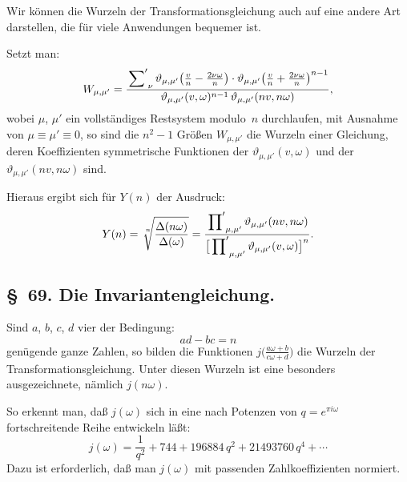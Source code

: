 \documentclass[11pt,a4paper]{article}
\theoremstyle{plain}
\theoremstyle{remark}
\begin{document}
Wir können die Wurzeln der Transformationsgleichung auch auf
eine andere Art darstellen, die für viele Anwendungen bequemer
ist.

Setzt man:
\begin{equation}\label{eq:68:1}
W_{\mu,\mu'} = \frac{
\sideset{}{'}\sum_{\nu}
\vartheta_{\mu,\mu'}\bigl(\frac{v}{n}-\frac{2\nu\omega}{n}\bigr)
\cdot
\vartheta_{\mu,\mu'}\bigl(\frac{v}{n}+\frac{2\nu\omega}{n}\bigr)^{n-1}}
{\vartheta_{\mu,\mu'}(v,\omega)^{n-1}\,
 \vartheta_{\mu,\mu'}(nv,n\omega)},
\end{equation}
wobei $\mu$, $\mu'$ ein vollständiges Restsystem modulo~$n$
durchlaufen, mit Ausnahme von $\mu\equiv\mu'\equiv 0$, so sind
die $n^2-1$ Größen $W_{\mu,\mu'}$ die Wurzeln einer Gleichung,
deren Koeffizienten symmetrische Funktionen der
$\vartheta_{\mu,\mu'}(v,\omega)$ und der
$\vartheta_{\mu,\mu'}(nv,n\omega)$ sind.

Hieraus ergibt sich für $Y(n)$ der Ausdruck:
\begin{equation}\label{eq:68:2}
Y(n) = \sqrt[\leftroot{-2}\uproot{2}n]
{\frac{\Delta(n\omega)}{\Delta(\omega)}}
= \frac{
\sideset{}{'}\prod_{\mu,\mu'}
\vartheta_{\mu,\mu'}(nv,n\omega)}
{\bigl[\sideset{}{'}\prod_{\mu,\mu'}
  \vartheta_{\mu,\mu'}(v,\omega)\bigr]^n}.
\end{equation}


\subsection*{§~69. Die Invariantengleichung.}

Sind $a$, $b$, $c$, $d$ vier der Bedingung:
\begin{equation}\label{eq:69:1}
ad-bc = n
\end{equation}
genügende ganze Zahlen, so bilden die Funktionen
$j\bigl(\frac{a\omega+b}{c\omega+d}\bigr)$ die Wurzeln der
Transformationsgleichung. Unter diesen Wurzeln ist eine
besonders ausgezeichnete, nämlich $j(n\omega)$.

So erkennt man, daß $j(\omega)$ sich in eine nach Potenzen
von $q=e^{\pi i\omega}$ fortschreitende Reihe entwickeln läßt:
\begin{equation}\label{eq:69:2}
j(\omega) = \frac{1}{q^2} + 744 + 196884\,q^2 + 21493760\,q^4
+ \cdots
\end{equation}
Dazu ist erforderlich, daß man $j(\omega)$ mit passenden
Zahlkoeffizienten normiert.
\end{document}
